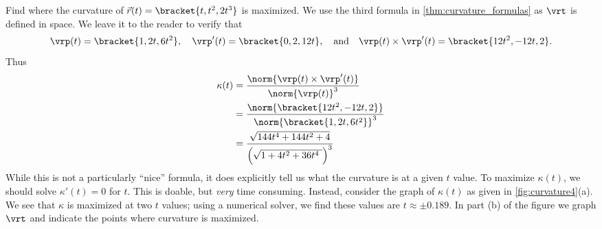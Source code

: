 \begin{example}\label{ex_curvature4}
Find where the curvature of $\vec r(t) =\bracket{t, t^2, 2t^3}$ is maximized.
\solution
We use the third formula in \autoref{thm:curvature_formulas} as $\vrt$ is defined in space. We leave it to the reader to verify that 
\[\vrp(t) =\bracket{1,2t,6t^2},\quad \vrp'(t) =\bracket{0,2,12t},\quad \text{and}\quad \vrp(t)\times \vrp'(t) =\bracket{12t^2,-12t,2}.\]
Thus 
\begin{align*}
\kappa(t) &= \frac{\norm{\vrp(t)\times\vrp'(t)}}{\norm{\vrp(t)}^3} \\
	&= \frac{\norm{\bracket{12t^2,-12t,2}}}{\norm{\bracket{1,2t,6t^2}}^3} \smallskip\\
	&= \frac{\sqrt{144t^4+144t^2+4}}{\Bigl(\sqrt{1+4t^2+36t^4\ }\Bigr)^3}
\end{align*}
%
While this is not a particularly ``nice'' formula, it does explicitly tell us what the curvature is at a given $t$ value. To maximize $\kappa(t)$, we should solve $\kappa'(t)=0$ for $t$. This is doable, but \emph{very} time consuming. Instead, consider the graph of $\kappa(t)$ as given in \autoref{fig:curvature4}(a). We see that $\kappa$ is maximized at two $t$ values; using a numerical solver, we find these values are $t\approx\pm 0.189$. In part (b) of the figure we graph $\vrt$ and indicate the points where curvature is maximized.
\end{example}

